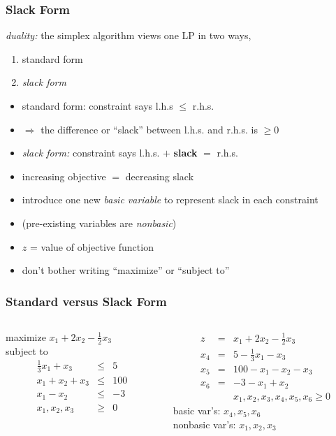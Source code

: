 \documentclass{beamer}
\begin{document}
\begin{frame} \frametitle{Slack Form}
\emph{duality:} the simplex algorithm views one LP in two ways,
\begin{enumerate}
  \item standard form
  \item \emph{slack form}
\end{enumerate}
\begin{itemize}
  \item standard form: constraint says l.h.s $\leq$ r.h.s.
  \item $\Rightarrow$ the difference or ``slack'' between l.h.s. and r.h.s.
    is $\geq 0$
  \item \emph{slack form:} constraint says l.h.s. $+$ \textbf{slack} $=$ r.h.s.
  \item increasing objective $=$ decreasing slack
  \item introduce one new \emph{basic variable} to represent slack in each constraint
  \item (pre-existing variables are \emph{nonbasic})
  \item $z$ = value of objective function
  \item don't bother writing ``maximize'' or ``subject to''
\end{itemize}
\end{frame}

\begin{frame} \frametitle{Standard versus Slack Form}
\begin{columns}
\begin{column}{.5\textwidth}
  maximize $x_1 + 2x_2 - \frac{1}{2} x_3$ \\
  subject to
  \begin{eqnarray*}
    \frac{1}{3} x_1 + x_3 &\leq& 5 \\
    x_1 + x_2 + x_3 &\leq& 100 \\
    x_1 - x_2 &\leq& -3 \\
    x_1, x_2, x_3 &\geq& 0
  \end{eqnarray*}
\end{column}
\begin{column}{.5\textwidth}
  \begin{eqnarray*}
    z &=& x_1 + 2x_2 - \frac{1}{2} x_3 \\
    x_4 &=& 5 - \frac{1}{3} x_1 - x_3 \\
    x_5 &=& 100 - x_1 - x_2 - x_3 \\
    x_6 &=& -3 -x_1 + x_2 \\
    & & x_1, x_2, x_3, x_4, x_5, x_6 \geq 0
  \end{eqnarray*}
  basic var's: $x_4, x_5, x_6$ \\
  nonbasic var's: $x_1, x_2, x_3$
\end{column}
\end{columns}
\end{frame}
\end{document}
